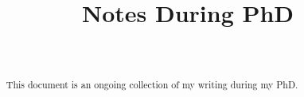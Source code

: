 \documentclass[aos,preprint]{imsart}
\numberwithin{equation}{section}
\begin{document}
\begin{frontmatter}
	\title{Notes During PhD}

	\begin{aug}
		\author[A]{~ }
		\address[A]{Centrum Wiskunde \& Informatica, Amsterdam, The Netherlands.}
	\end{aug}

\end{frontmatter}


\tableofcontents

\begin{abstract}
	\noindent
	This document is an ongoing collection of my writing during my PhD.
\end{abstract}





















\clearpage

\nocite{*}



\end{document}

